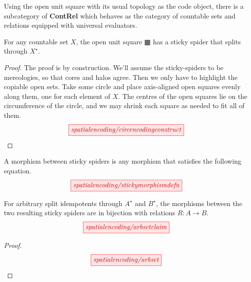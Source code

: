 \begin{myboxB}
\begin{construction}\label{cons:unitencoding}
Using the open unit square with its usual topology as the code object, there is a subcategory of \textbf{ContRel} which behaves as the category of countable sets and relations equipped with universal evaluators.
\end{construction}
\end{myboxB}

\begin{myboxB}
\begin{proposition}
For any countable set $X$, the open unit square $\squarehvfill$ has a sticky spider that splits through $X^\star$.
\begin{proof}
The proof is by construction. We'll assume the sticky-spiders to be mereologies, so that cores and halos agree. Then we only have to highlight the copiable open sets. Take some circle and place axis-aligned open squares evenly along them, one for each element of $X$. The centres of the open squares lie on the circumference of the circle, and we may shrink each square as needed to fit all of them.
\[\scalebox{1}{\tikzfig{spatialencoding/circencodingconstruct}}\]
\end{proof}
\end{proposition}
\end{myboxB}

\begin{myboxB}
\begin{defn}
A morphism between sticky spiders is any morphism that satisfies the following equation.
\[\scalebox{1}{\tikzfig{spatialencoding/stickymorphismdefn}}\]
\end{defn}
\end{myboxB}

\begin{myboxB}
\begin{proposition}
For arbitrary split idempotents through $A^\star$ and $B^\star$, the morphisms between the two resulting sticky spiders are in bijection with relations $R: A \rightarrow B$.
\[\scalebox{1}{\tikzfig{spatialencoding/arbsetclaim}}\]
\begin{proof}
\[\scalebox{1}{\tikzfig{spatialencoding/arbset}}\]
\end{proof}
\end{proposition}
\end{myboxB}

